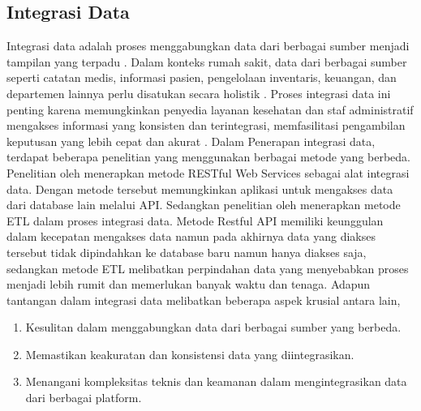 \subsection{Integrasi Data}
Integrasi data adalah proses menggabungkan data dari berbagai sumber menjadi tampilan yang terpadu \parencite{Neang2021DataIA}. Dalam konteks rumah sakit, data dari berbagai sumber seperti catatan medis, informasi pasien, pengelolaan inventaris, keuangan, dan departemen lainnya perlu disatukan secara holistik \parencite*{Oliva2018}. Proses integrasi data ini penting karena memungkinkan penyedia layanan kesehatan dan staf administratif mengakses informasi yang konsisten dan terintegrasi, memfasilitasi pengambilan keputusan yang lebih cepat dan akurat \parencite{Basile2023}. Dalam Penerapan integrasi data, terdapat beberapa penelitian yang menggunakan berbagai metode yang berbeda. Penelitian oleh \textcite{Baharuddin2022IMPLEMENTASIWS} menerapkan metode RESTful Web Services sebagai alat integrasi data. Dengan metode tersebut memungkinkan aplikasi untuk mengakses data dari database lain melalui API. Sedangkan penelitian oleh \textcite{Firdaus2022MEMBANGUNID} menerapkan metode ETL dalam proses integrasi data. Metode Restful API memiliki keunggulan dalam kecepatan mengakses data namun pada akhirnya data yang diakses tersebut tidak dipindahkan ke database baru namun hanya diakses saja, sedangkan metode ETL melibatkan perpindahan data yang menyebabkan proses menjadi lebih rumit dan memerlukan banyak waktu dan tenaga. Adapun tantangan dalam integrasi data melibatkan beberapa aspek krusial antara lain,
\begin{enumerate}
  \item Kesulitan dalam menggabungkan data dari berbagai sumber yang berbeda.
  \item Memastikan keakuratan dan konsistensi data yang diintegrasikan.
  \item Menangani kompleksitas teknis dan keamanan dalam mengintegrasikan data dari berbagai platform.
\end{enumerate}



